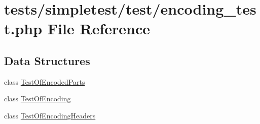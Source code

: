 \hypertarget{encoding__test_8php}{\section{tests/simpletest/test/encoding\-\_\-test.php File Reference}
\label{encoding__test_8php}
}
\subsection*{Data Structures}
\begin{DoxyCompactItemize}
\item 
class \hyperlink{class_test_of_encoded_parts}{Test\-Of\-Encoded\-Parts}
\item 
class \hyperlink{class_test_of_encoding}{Test\-Of\-Encoding}
\item 
class \hyperlink{class_test_of_encoding_headers}{Test\-Of\-Encoding\-Headers}
\end{DoxyCompactItemize}
